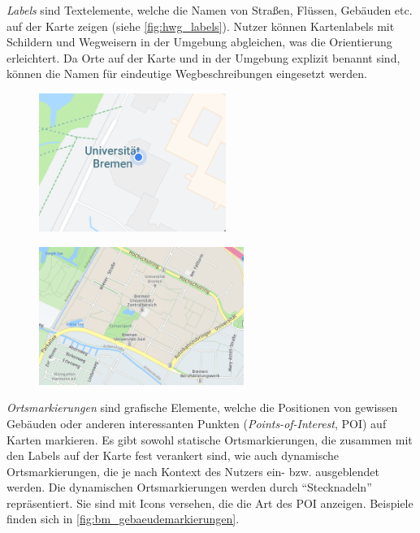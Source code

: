 \emph{Labels} sind Textelemente, welche die Namen von Straßen, Flüssen, Gebäuden etc. auf der Karte zeigen (siehe \autoref{fig:hwg_labels}).
Nutzer können Kartenlabels mit Schildern und Wegweisern in der Umgebung abgleichen, was die Orientierung erleichtert.
Da Orte auf der Karte und in der Umgebung explizit benannt sind, können die Namen für eindeutige Wegbeschreibungen eingesetzt werden.
\begin{figure}[h]
    \centering
    \begin{minipage}[t]{.485\textwidth}
        \centering
        \vspace{0pt}
        \includegraphics[width=\linewidth, height=4.5cm]{figures/map-app_examples/gm_positionsmarker}
        \label{fig:gm_positionsmarker}
        \vfill
    \end{minipage}
    \hfill
    \begin{minipage}[t]{.485\textwidth}
        \centering
        \vspace{0pt}
        \includegraphics[width=\linewidth, height=4.5cm]{figures/map-app_examples/hwg_labels}
        \label{fig:hwg_labels}
    \end{minipage}
\end{figure}

\emph{Ortsmarkierungen} sind grafische Elemente, welche die Positionen von gewissen Gebäuden oder anderen interessanten Punkten (\emph{Points-of-Interest}, POI) auf Karten markieren.
Es gibt sowohl statische Ortsmarkierungen, die zusammen mit den Labels auf der Karte fest verankert sind, wie auch dynamische Ortsmarkierungen, die je nach Kontext des Nutzers ein- bzw. ausgeblendet werden.
Die dynamischen Ortsmarkierungen werden durch \enquote{Stecknadeln} repräsentiert.
Sie sind mit Icons versehen, die die Art des POI anzeigen.
Beispiele finden sich in \autoref{fig:bm_gebaeudemarkierungen}.

